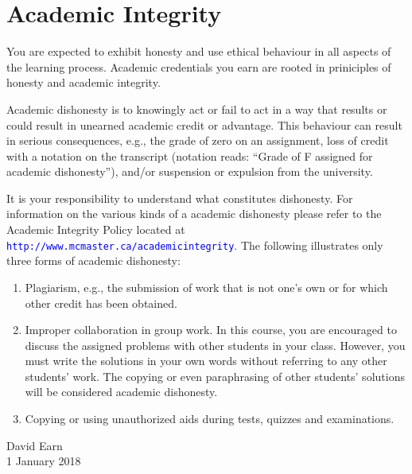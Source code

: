 \documentclass[12pt]{article}
\newcommand{\url}[1]{{\tt\textcolor{blue}{#1}}}
\begin{document}
\section*{Academic Integrity}

You are expected to exhibit honesty and use ethical behaviour in all aspects of the learning process. Academic credentials you earn are rooted in priniciples of honesty and academic integrity.

Academic dishonesty is to knowingly act or fail to act in a way that results or could result in unearned academic credit or advantage.  This behaviour can result in serious consequences, e.g., the grade of zero on an assignment, loss of credit with a notation on the transcript (notation reads: ``Grade of F assigned for academic dishonesty''), and/or suspension or expulsion from the university.

It is your responsibility to understand what constitutes dishonesty.  For information on the various kinds of a academic dishonesty please refer to the Academic Integrity Policy located at \url{http://www.mcmaster.ca/academicintegrity}.  The following illustrates only three forms of academic dishonesty:
\begin{enumerate}\addtolength{\itemsep}{-0.5\baselineskip}

\item Plagiarism, e.g., the submission of work that is not one's own or for which other credit has been obtained.

\item Improper collaboration in group work. In this course, you are encouraged to discuss the assigned problems with other students in your class. However, you must write the solutions in your own words without referring to any other students' work. The copying or even paraphrasing of other students' solutions will be considered academic dishonesty.

\item Copying or using unauthorized aids during tests, quizzes and examinations.

\end{enumerate}

\bigskip \bigskip
\noindent
David Earn\\
1 January 2018
\end{document}
